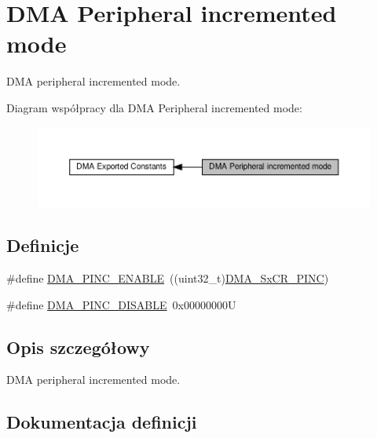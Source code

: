 \hypertarget{group___d_m_a___peripheral__incremented__mode}{}\section{D\+MA Peripheral incremented mode}
\label{group___d_m_a___peripheral__incremented__mode}


D\+MA peripheral incremented mode.  


Diagram współpracy dla D\+MA Peripheral incremented mode\+:\nopagebreak
\begin{figure}[H]
\begin{center}
\leavevmode
\includegraphics[width=350pt]{group___d_m_a___peripheral__incremented__mode}
\end{center}
\end{figure}
\subsection*{Definicje}
\begin{DoxyCompactItemize}
\item 
\#define \hyperlink{group___d_m_a___peripheral__incremented__mode_gab6d84e5805302516d26c06fb4497a346}{D\+M\+A\+\_\+\+P\+I\+N\+C\+\_\+\+E\+N\+A\+B\+LE}~((uint32\+\_\+t)\hyperlink{group___peripheral___registers___bits___definition_ga29c5d5c559dd14646fdc170e74f1f03b}{D\+M\+A\+\_\+\+Sx\+C\+R\+\_\+\+P\+I\+NC})
\item 
\#define \hyperlink{group___d_m_a___peripheral__incremented__mode_ga63e2aff2973d1a8f01d5d7b6e4894f39}{D\+M\+A\+\_\+\+P\+I\+N\+C\+\_\+\+D\+I\+S\+A\+B\+LE}~0x00000000U
\end{DoxyCompactItemize}


\subsection{Opis szczegółowy}
D\+MA peripheral incremented mode. 



\subsection{Dokumentacja definicji}
\mbox{\label{group___d_m_a___peripheral__incremented__mode_ga63e2aff2973d1a8f01d5d7b6e4894f39}} 
